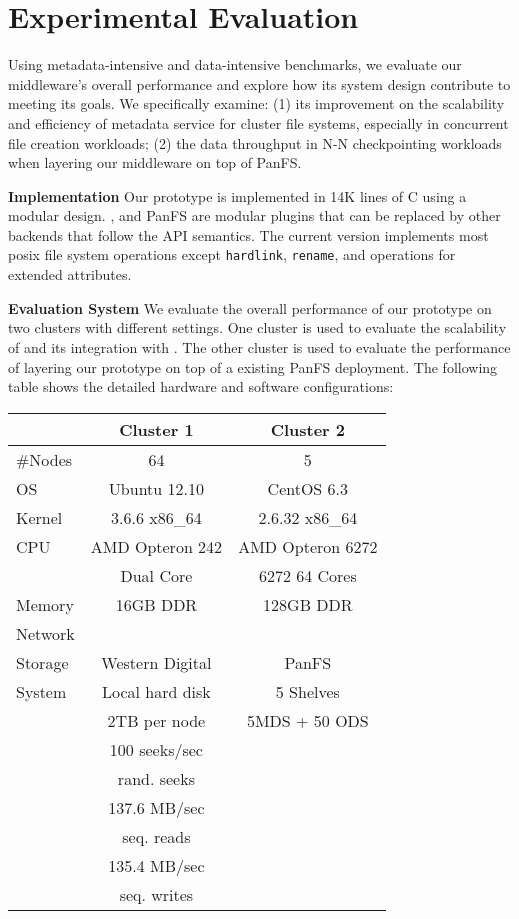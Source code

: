 \section{Experimental Evaluation}

Using metadata-intensive and data-intensive benchmarks,
we evaluate our middleware's overall performance
and explore how its system design contribute to meeting its goals.
We specifically examine: (1) its improvement on the scalability and
efficiency of metadata service for cluster file systems,
especially in concurrent file creation workloads;
(2) the data throughput in N-N checkpointing workloads
when layering our middleware on top of PanFS.

\textbf{Implementation}
Our prototype is implemented in 14K lines of C using a modular design.
\tfs, \ldb and PanFS are modular plugins that can be replaced by other backends
that follow the API semantics. The current version implements most posix
file system operations except \texttt{hardlink}, \texttt{rename},
and operations for extended attributes.

\textbf{Evaluation System }
We evaluate the overall performance of our prototype
on two clusters with different settings.
One cluster is used to evaluate the scalability of \tfs and its integration with \giga.
The other cluster is used to evaluate the performance of layering our
prototype on top of a existing PanFS deployment.
The following table shows the detailed hardware and software configurations:

\begin{center}
\begin{tabular}{lcc}
\toprule
      & Cluster 1 & Cluster 2 \\
\midrule
\#Nodes & 64  &  5 \\
\hline
OS & Ubuntu 12.10  &   CentOS 6.3  \\
Kernel & 3.6.6 x86\_64 & 2.6.32 x86\_64\\
\hline
CPU & AMD Opteron 242   &  AMD Opteron 6272 \\
    & Dual Core & 6272 64 Cores\\
\hline
Memory & 16GB DDR &  128GB DDR \\
\hline
Network &       &           \\
\hline
Storage & Western Digital &  PanFS\\
System & Local hard disk &      5 Shelves \\
       &  2TB per node &   5MDS + 50 ODS \\
& 100 seeks/sec & \\
& rand. seeks        & \\
& 137.6 MB/sec & \\
& seq. reads      & \\
& 135.4 MB/sec & \\
& seq. writes      & \\
\bottomrule
\end{tabular}
\end{center}


